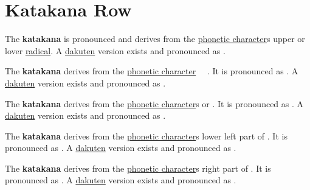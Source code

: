 \section{Katakana  Row}\label{sec:KatakanaTaRow}


\label{letter:ta} The  \textbf{katakana}  is
pronounced  and derives from the
\hyperref[sec:PhoneticCharacter]{phonetic character}s 
upper or lover \hyperref[sec:Radical]{radical}.  A
\hyperref[sec:Dakuten]{dakuten} version exists and pronounced as .

\label{letter:chi} The \textbf{katakana} 
derives from the \hyperref[sec:PhoneticCharacter]{phonetic character}　
.  It is pronounced as .  A
\hyperref[sec:Dakuten]{dakuten} version exists and pronounced as .

\label{letter:tsu} The \textbf{katakana} 
derives from the \hyperref[sec:PhoneticCharacter]{phonetic character}s
 or  .  It is pronounced as .  A
\hyperref[sec:Dakuten]{dakuten} version exists and pronounced as .

\label{letter:te} The \textbf{katakana}  derives
from the \hyperref[sec:PhoneticCharacter]{phonetic character}s lower left part
of .  It is pronounced as .  A
\hyperref[sec:Dakuten]{dakuten} version exists and pronounced as .

\newpage

\label{letter:to} The \textbf{katakana}  derives
from the \hyperref[sec:PhoneticCharacter]{phonetic character}s right part of
.  It is pronounced as .  A
\hyperref[sec:Dakuten]{dakuten} version exists and pronounced as .



\newpage

\subsection{}\label{sec:KatakanaTa}

